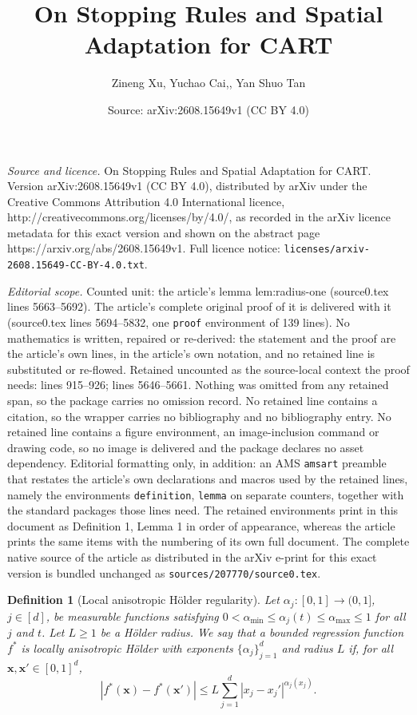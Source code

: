 \documentclass[10pt,a4paper]{amsart}
\title{On Stopping Rules and Spatial Adaptation for CART}
\author{Zineng Xu, Yuchao Cai,, Yan Shuo Tan}
\date{Source: arXiv:2608.15649v1 (CC BY 4.0)}
\newtheorem{definition}{Definition}
\newcommand{\bx}{\mathbf{x}}
\begin{document}
\maketitle

\noindent\emph{Source and licence.} On Stopping Rules and Spatial Adaptation for CART. Version arXiv:2608.15649v1 (CC BY 4.0), distributed by arXiv under the Creative Commons Attribution 4.0 International licence, http://creativecommons.org/licenses/by/4.0/, as recorded in the arXiv licence metadata for this exact version and shown on the abstract page https://arxiv.org/abs/2608.15649v1. Full licence notice: \texttt{licenses/arxiv-2608.15649-CC-BY-4.0.txt}.\par\smallskip

\noindent\textit{Editorial scope.} Counted unit: the article's lemma lem:radius-one (source0.tex lines 5663--5692). The article's complete original proof of it is delivered with it (source0.tex lines 5694--5832, one \texttt{proof} environment of 139 lines). No mathematics is written, repaired or re-derived: the statement and the proof are the article's own lines, in the article's own notation, and no retained line is substituted or re-flowed.  Retained uncounted as the source-local context the proof needs: lines 915--926; lines 5646--5661.  Nothing was omitted from any retained span, so the package carries no omission record.  No retained line contains a citation, so the wrapper carries no bibliography and no bibliography entry.  No retained line contains a figure environment, an image-inclusion command or drawing code, so no image is delivered and the package declares no asset dependency.  Editorial formatting only, in addition: an AMS \texttt{amsart} preamble that restates the article's own declarations and macros used by the retained lines, namely the environments \texttt{definition}, \texttt{lemma} on separate counters, together with the standard packages those lines need.  The retained environments print in this document as Definition 1, Lemma 1 in order of appearance, whereas the article prints the same items with the numbering of its own full document.  The complete native source of the article as distributed in the arXiv e-print for this exact version is bundled unchanged as \texttt{sources/207770/source0.tex}.
\begin{definition}[Local anisotropic H\"older regularity]
\label{def::localholder}
Let $\alpha_j:[0,1]\to(0,1]$, $j\in[d]$, be measurable functions satisfying
$0<\alpha_{\min}\le\alpha_j(t)\le\alpha_{\max}\le1$ for all $j$ and $t$.
Let $L\ge1$ be a H\"older radius.
We say that a bounded regression function $f^*$ is locally anisotropic H\"older with exponents $\{\alpha_j\}_{j=1}^d$ and radius $L$ if, for all $\bx,\bx'\in[0,1]^d$,
\[
|f^*(\bx)-f^*(\bx')|
\le
L\sum_{j=1}^d |x_j-x_j'|^{\alpha_j(x_j)}.
\]
\end{definition}
\end{document}
